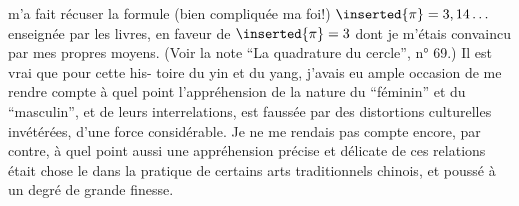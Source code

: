 m'a fait récuser la formule (bien compliquée ma foi!) $\inserted{\pi}=3,14\ldots$ enseignée par
les livres, en faveur de $\inserted{\pi}=3$ dont je m'étais convaincu par mes propres moyens.
(Voir la note ``La quadrature du cercle'', n° 69.) Il est vrai que pour cette his-
toire du yin et du yang, j'avais eu ample occasion de me rendre compte à quel
point l'appréhension de la nature du ``féminin'' et du ``masculin'', et de leurs
interrelations, est faussée par des distortions culturelles invétérées, d'une
force considérable. Je ne me rendais pas compte encore, par contre, à quel point
aussi une appréhension précise et délicate de ces relations était chose le
dans la pratique de certains arts traditionnels chinois, et poussé à un degré
de grande finesse.
\margin{$-$}

